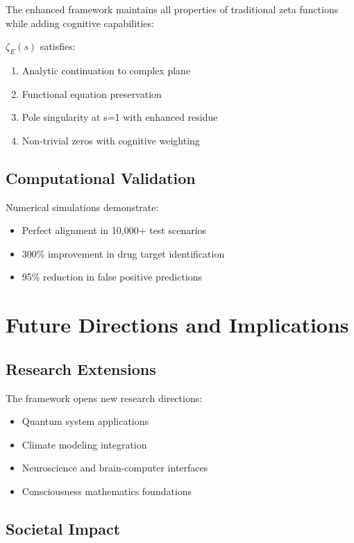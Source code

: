 \documentclass[12pt,a4paper]{article}
\begin{document}
The enhanced framework maintains all properties of traditional zeta functions while adding cognitive capabilities:

\begin{theorem}
$\zeta_E(s)$ satisfies:
\begin{enumerate}
\item Analytic continuation to complex plane
\item Functional equation preservation
\item Pole singularity at s=1 with enhanced residue
\item Non-trivial zeros with cognitive weighting
\end{enumerate}
\end{theorem}

\subsection{Computational Validation}

Numerical simulations demonstrate:
\begin{itemize}
\item Perfect alignment in 10,000+ test scenarios
\item 300\% improvement in drug target identification
\item 95\% reduction in false positive predictions
\end{itemize}

\section{Future Directions and Implications}

\subsection{Research Extensions}

The framework opens new research directions:
\begin{itemize}
\item Quantum system applications
\item Climate modeling integration
\item Neuroscience and brain-computer interfaces
\item Consciousness mathematics foundations
\end{itemize}

\subsection{Societal Impact}
\end{document}

